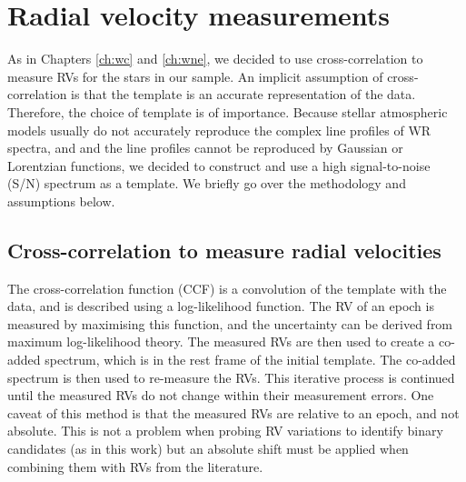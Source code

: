 \section{Radial velocity measurements} \label{sect:rv_WNL}

As in Chapters \ref{ch:wc} and \ref{ch:wne}, we decided to use cross-correlation to measure RVs for the stars in our sample. An implicit assumption of cross-correlation is that the template is an accurate representation of the data. Therefore, the choice of template is of importance. Because stellar atmospheric models usually do not accurately reproduce the complex line profiles of WR spectra, and and the line profiles cannot be reproduced by Gaussian or Lorentzian functions, we decided to construct and use a high signal-to-noise (S/N) spectrum as a template. We briefly go over the methodology and assumptions below.

\subsection{Cross-correlation to measure radial velocities}

The cross-correlation function (CCF) is a convolution of the template with the data, and is described using a log-likelihood function. The RV of an epoch is measured by maximising this function, and the uncertainty can be derived from maximum log-likelihood theory. The measured RVs are then used to create a co-added spectrum, which is in the rest frame of the initial template. The co-added spectrum is then used to re-measure the RVs. This iterative process is continued until the measured RVs do not change within their measurement errors. One caveat of this method is that the measured RVs are relative to an epoch, and not absolute. This is not a problem when probing RV variations to identify binary candidates (as in this work) but an absolute shift must be applied when combining them with RVs from the literature.


